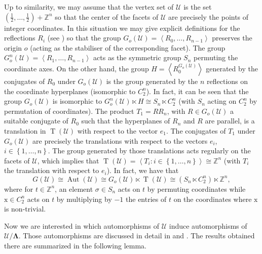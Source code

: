 \documentclass[final]{amsart}
\theoremstyle{plain}
\theoremstyle{definition}
\theoremstyle{remark}
\numberwithin{equation}{section}
\renewcommand{\{}{\lbrace}
\renewcommand{\}}{\rbrace}
\newcommand{\bZ}{\mathbb{Z}}
\newcommand{\cU}{\mathcal{U}}
\newcommand{\bLL}{\mathbf{\Lambda}}
\newcommand{\cyvec}[1]{{\mathrm{#1}}}
\newcommand{\vx}{\cyvec{x}}
\DeclareMathOperator{\aut}{Aut} \DeclareMathOperator{\autp}{\aut^{+}}
\DeclareMathOperator{\tras}{T}
\newcommand{\UoverL}{\cU/\bLL}
\begin{document}
Up to similarity, we may assume that the vertex set of $\cU$ is the set $(\frac{1}{2}, \dots, \frac{1}{2}) + \bZ^{n}$ so that the center of the facets of $\cU$ are precisely the points of integer coordinates. 
In this situation we may give explicit definitions for the reflections $R_{i}$ (see \cite[Table 2]{CollinsMontero_2021_EquivelarToroidsFew}) so that the group $G_{o}(\cU) = \left\langle R_{0}, \dots, R_{n-1} \right\rangle $ preserves the origin $o$ (acting as the stabiliser of the corresponding facet).
The group $G^{n}_{o}(\cU)=\left\langle R_{1}, \dots, R_{n-1} \right\rangle $ acts as the symmetric group $S_{n}$ permuting the coordinate axes. 
On the other hand, the group $H=\left\langle R_{0}^{G_{o}(\cU)} \right\rangle $ generated by the conjugates of $R_{0}$ under $G_{o}(\cU)$ is the group generated by the $n$ reflections on the coordinate hyperplanes (isomorphic to $C_{2}^{n}$).
In fact, it can be seen that the group $G_{o}(\cU)$ is isomorphic to $G^{n}_{o}(\cU) \ltimes H \cong S_{n} \ltimes C_{2}^{n}$ (with $S_{n}$ acting on $ C_{2}^{n}$ by permutation of coordinates).
The product $T_{1}= R R_{n}$, with $R \in G_{o}(\cU)$ a suitable conjugate of $R_{0}$ such that the hyperplanes of $R_{n}$ and $R$ are parallel, is a translation in $\tras(\cU)$ with respect to the vector $e_{1}$.
The conjugates of $T_{1}$ under $G_{o}(\cU)$ are precisely the translations with respect to the vectors $e_{i}$, $i \in \left\{ 1, \dots, n \right\}$.  
The group generated by those translations acts regularly on the facets of $\cU$, which implies that $\tras(\cU) = \left\langle T_{i} : i \in \left\{ 1, \dots, n \right\} \right\rangle \cong \bZ^{n} $ (with $T_{i}$ the translation with respect to $e_{i}$).
In fact, we have that 
\[G(\cU) \cong \aut(\cU) \cong G_{o}(\cU) \ltimes \tras(\cU) \cong (S_{n}\ltimes C_{2}^{n}) \ltimes \bZ^{n},\]
where for $t \in \bZ^{n}$, an element $\sigma \in S_{n}$ acts on $t$ by permuting coordinates while  $\vx \in  C_{2}^{n}$ acts on $t$ by multiplying by $-1$ the entries of $t$ on the coordinates where $\vx$ is non-trivial.

Now we are interested in which automorphisms of $\cU$ induce automorphisms of $\UoverL$. 
Those automorphisms are discussed in detail in \cite[Sect. 3]{HubardOrbanicPellicerWeiss_2012_SymmetriesEquivelar4} and \cite[Sect. 2]{CollinsMontero_2021_EquivelarToroidsFew}. 
The results obtained there are summarized in the following lemma.
\end{document}
